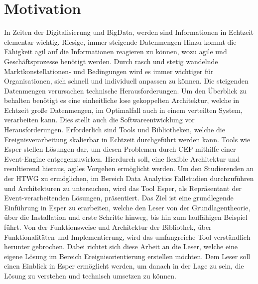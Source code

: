 \chapter{Motivation}
In Zeiten der Digitalisierung und BigData, werden sind Informationen in Echtzeit elementar wichtig.
Riesige, immer steigende Datenmengen
Hinzu kommt die Fähigkeit agil auf die Informationen reagieren zu können, wozu agile und Geschäftsprozesse benötigt werden. 
Durch rasch und stetig wandelnde Marktkonstellationen- und Bedingungen wird es immer wichtiger für Organisationen, sich schnell und individuell anpassen zu können. Die steigenden Datenmengen verursachen technische Herausforderungen. Um den Überblick zu behalten benötigt es eine einheitliche lose gekoppelten Architektur, welche in Echtzeit große Datenmengen, im Optimalfall auch in einem verteilten System, verarbeiten kann. Dies stellt auch die Softwareentwicklung vor Herausforderungen.
Erforderlich sind Tools und Bibliotheken, welche die Ereignisverarbeitung skalierbar in Echtzeit durchgeführt werden kann. Tools wie Esper stellen Lösungen dar, um diesen Problemen durch CEP mithilfe einer Event-Engine entgegenzuwirken. Hierdurch soll, eine flexible Architektur und resultierend hieraus, agiles Vorgehen ermöglicht werden.
Um den Studierenden an der HTWG zu ermöglichen, im Bereich Data Analytics Fallstudien durchzuführen und Architekturen zu untersuchen, wird das Tool Esper, als Repräsentant der Event-verarbeitenden Lösungen, präsentiert.
Das Ziel ist eine grundlegende Einführung in Esper zu erarbeiten, welche den Leser von der Grundlagentheorie, über die Installation und erste Schritte hinweg, bis hin zum lauffähigen Beispiel führt.
Von der Funktionsweise und Architektur der Bibliothek, über Funktionalitäten und Implementierung, wird das umfangreiche Tool verständlich herunter gebrochen. Dabei richtet sich diese Arbeit an die Leser, welche eine eigene Lösung im Bereich Ereignisorientierung erstellen möchten.
Dem Leser soll einen Einblick in Esper ermöglicht werden, um danach in der Lage zu sein, die Lösung zu verstehen und technisch umsetzen zu können.
